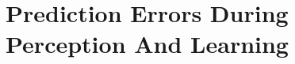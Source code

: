 \documentclass[main]{subfiles}
\begin{document}
\newpage
\section{Prediction Errors During Perception And Learning}
\end{document}
